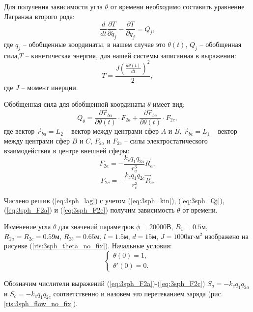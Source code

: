 Для получения зависимости угла $\theta$ от времени необходимо составить уравнение Лагранжа второго рода\cite{markeev}:
\begin{equation}
\label{eq:3sph_lag}
	\frac{d}{dt}\frac{\partial T}{\partial \dot{q_j}} - \frac{\partial T}{\partial q_j} = Q_j,
\end{equation}
где $q_j$ – обобщенные координаты, в нашем случае это $\theta(t)$, $Q_j$ – обобщенная сила,$T$ – кинетическая энергия, для нашей системы записанная в выражении:
\begin{equation}
\label{eq:3sph_kin}
	T = \frac{J \left(\frac{d \theta (t)}{dt}\right)^2}{2},
\end{equation}
где $J$ – момент инерции.

Обобщенная сила для обобщенной координаты $\theta$ имеет вид:
\begin{equation}
\label{eq:3sph_Qj}
	Q_\theta = \frac{\partial \vec{r}_{ba}}{\partial \theta(t)} \cdot F_{2a} + \frac{\partial \vec{r}_{bc}}{\partial \theta(t)} \cdot F_{2c},
\end{equation}
где вектор $\vec{r}_{ba} = L_2$ – вектор между центрами сфер $A$ и $B$, $\vec{r}_{bc} = L_1$ – вектор между центрами сфер $B$ и $C$, $F_{2a}$ и $F_{2c}$ – силы электростатического взаимодействия в центре внешней сферы:
\begin{equation}
\label{eq:3sph_F2a}
	F_{2a} = - \frac{k_c q_1 q_{2a}}{r_a^3} \vec{R}_a,
\end{equation}
\begin{equation}
\label{eq:3sph_F2c}
	F_{2c} = - \frac{k_c q_1 q_{2c}}{r_c^3} \vec{R}_c.
\end{equation}

Числено решив (\ref{eq:3sph_lag}) с учетом (\ref{eq:3sph_kin}), (\ref{eq:3sph_Qj}), (\ref{eq:3sph_F2a}) и (\ref{eq:3sph_F2c}) получим зависимость $\theta$ от времени.

Изменение угла $\theta$ для значений параметров $\phi = 20000$В, $R_1 = 0.5$м, $R_{2a} = R_{2c} = 0.59$м, $R_{2b} = 0.65$м, $l = 1.5$м, $d = 15$м, $J = 1000$кг$\cdot$м${}^2$ \cite{3sph} изображено на рисунке (\ref{ris:3sph_theta_no_fix}).
Начальные условия:
\begin{equation}
	\begin{cases}
		\theta(0) = 1,\\
		\theta'(0) = 0.
	\end{cases}
\end{equation}

Обозначим числители выражений (\ref{eq:3sph_F2a})-(\ref{eq:3sph_F2c}) $S_a = - k_c q_1 q_{2a}$ и $S_c = - k_c q_1 q_{2c}$ соответственно и назовем это перетеканием заряда (рис. \ref{ris:3sph_flow_no_fix}).

